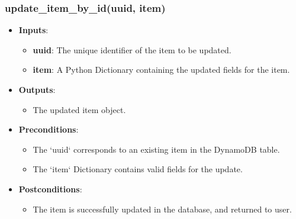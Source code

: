 \documentclass[12pt, titlepage]{article}
\begin{document}
\subsubsection{update\_item\_by\_id(uuid, item)}
\begin{itemize}
    \item \textbf{Inputs}:
        \begin{itemize}
            \item \textbf{uuid}: The unique identifier of the item to be updated.
            \item \textbf{item}: A Python Dictionary containing the updated fields for the item.
        \end{itemize}
    \item \textbf{Outputs}:
        \begin{itemize}
            \item The updated item object.
        \end{itemize}
    \item \textbf{Preconditions}:
        \begin{itemize}
            \item The `uuid` corresponds to an existing item in the DynamoDB table.
            \item The `item` Dictionary contains valid fields for the update.
        \end{itemize}
    \item \textbf{Postconditions}:
        \begin{itemize}
            \item The item is successfully updated in the database, and returned to user.
        \end{itemize}
\end{itemize}
\end{document}
